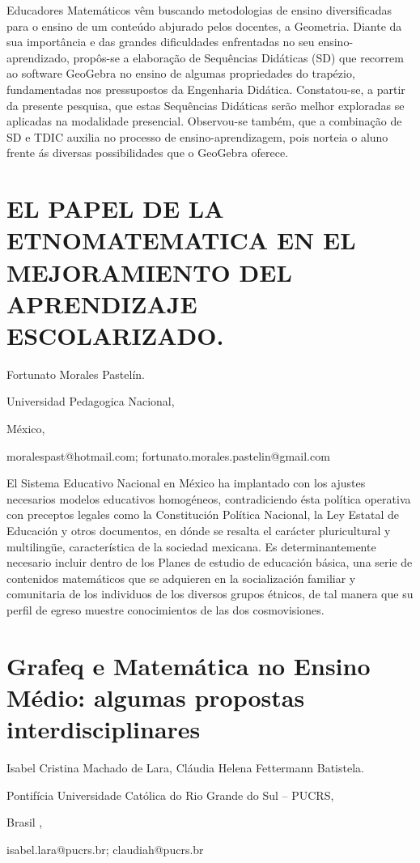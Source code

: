 Educadores Matemáticos vêm buscando metodologias de ensino diversificadas
para o ensino de um conteúdo abjurado pelos docentes, a Geometria.
Diante da sua importância e das grandes dificuldades enfrentadas no
seu ensino-aprendizado, propôs-se a elaboração de Sequências Didáticas
(SD) que recorrem ao software GeoGebra no ensino de algumas propriedades
do trapézio, fundamentadas nos pressupostos da Engenharia Didática.
Constatou-se, a partir da presente pesquisa, que estas Sequências
Didáticas serão melhor exploradas se aplicadas na modalidade presencial.
Observou-se também, que a combinação de SD e TDIC auxilia no processo
de ensino-aprendizagem, pois norteia o aluno frente ás diversas possibilidades
que o GeoGebra oferece.


\section{EL PAPEL DE LA ETNOMATEMATICA EN EL MEJORAMIENTO DEL APRENDIZAJE
ESCOLARIZADO.}

\begin{datos}

Fortunato Morales Pastelín.

Universidad Pedagogica Nacional,

México,

moralespast@hotmail.com; fortunato.morales.pastelin@gmail.com

\end{datos}

El Sistema Educativo Nacional en México ha implantado con los ajustes
necesarios modelos educativos homogéneos, contradiciendo ésta política
operativa con preceptos legales como la Constitución Política Nacional,
la Ley Estatal de Educación y otros documentos, en dónde se resalta
el carácter pluricultural y multilingüe, característica de la sociedad
mexicana. Es determinantemente necesario incluir dentro de los Planes
de estudio de educación básica, una serie de contenidos matemáticos
que se adquieren en la socialización familiar y comunitaria de los
individuos de los diversos grupos étnicos, de tal manera que su perfil
de egreso muestre conocimientos de las dos cosmovisiones.


\section{Grafeq e Matemática no Ensino Médio: algumas propostas interdisciplinares}

\begin{datos}

Isabel Cristina Machado de Lara, Cláudia Helena Fettermann Batistela.

Pontifícia Universidade Católica do Rio Grande do Sul – PUCRS,

Brasil ,

isabel.lara@pucrs.br; claudiah@pucrs.br 

\end{datos}

